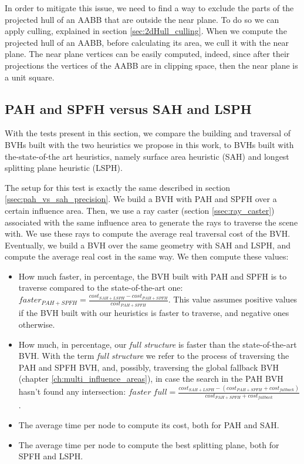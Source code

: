 \documentclass{PoliMi_MasterThesis}
\begin{document}
In order to mitigate this issue, we need to find a way to exclude the parts of the projected hull of an AABB that are outside the near plane. To do so we can apply culling, explained in section \ref{sec:2dHull_culling}. When we compute the projected hull of an AABB, before calculating its area, we cull it with the near plane. The near plane vertices can be easily computed, indeed, since after their projections the vertices of the AABB are in clipping space, then the near plane is a unit square.

\subsection{PAH and SPFH versus SAH and LSPH} \label{ssec:pah_spfh_vs_sah_lsph}
With the tests present in this section, we compare the building and traversal of BVHs built with the two heuristics we propose in this work, to BVHs built with the-state-of-the art heuristics, namely surface area heuristic (SAH) and longest splitting plane heuristic (LSPH). 

The setup for this test is exactly the same described in section \ref{ssec:pah_vs_sah_precision}. We build a BVH with PAH and SPFH over a certain influence area. Then, we use a ray caster (section \ref{ssec:ray_caster}) associated with the same influence area to generate the rays to traverse the scene with. We use these rays to compute the average real traversal cost of the BVH. Eventually, we build a BVH over the same geometry with SAH and LSPH, and compute the average real cost in the same way. We then compute these values: 

\begin{itemize}
	\item How much faster, in percentage, the BVH built with PAH and SPFH is to traverse compared to the state-of-the-art one: $faster_{PAH+SPFH} = \frac{cost_{SAH+LSPH}-cost_{PAH+SPFH}}{cost_{PAH+SPFH}}$. This value assumes positive values if the BVH built with our heuristics is faster to traverse, and negative ones otherwise.
	\item How much, in percentage, our \textit{full structure} is faster than the state-of-the-art BVH. With the term \textit{full structure} we refer to the process of traversing the PAH and SPFH BVH, and, possibly, traversing the global fallback BVH (chapter \ref{ch:multi_influence_areas}), in case the search in the PAH BVH hasn't found any intersection: $faster \; full = \frac{cost_{SAH+LSPH}-(cost_{PAH+SPFH}+cost_{fallback})}{cost_{PAH+SPFH}+cost_{fallback}}$.
	\item The average time per node to compute its cost, both for PAH and SAH.
	\item The average time per node to compute the best splitting plane, both for SPFH and LSPH.
\end{itemize}
\end{document}
